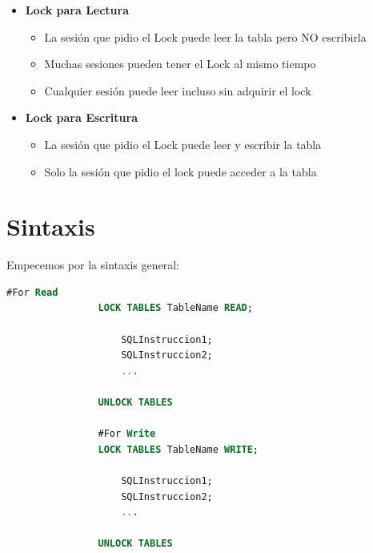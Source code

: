 \documentclass[12pt, fleqn]{report}                             %
\begin{document}
                \begin{itemize}
                    \item 
                        \textbf{Lock para Lectura}
                        \begin{itemize}
                            \item La sesión que pidio el Lock puede leer la tabla pero NO escribirla
                            \item Muchas sesiones pueden tener el Lock al mismo tiempo
                            \item Cualquier sesión puede leer incluso sin adquirir el lock
                        \end{itemize}

                    \item 
                        \textbf{Lock para Escritura}
                        \begin{itemize}
                            \item La sesión que pidio el Lock puede leer y escribir la tabla
                            \item Solo la sesión que pidio el lock puede acceder a la tabla
                        \end{itemize}
                \end{itemize}


        \clearpage
        \section{Sintaxis}

            Empecemos por la sintaxis general:

            \begin{lstlisting}[language=SQL, gobble=16]
                #For Read
                LOCK TABLES TableName READ;

                    SQLInstruccion1;
                    SQLInstruccion2;
                    ...

                UNLOCK TABLES

                #For Write
                LOCK TABLES TableName WRITE;

                    SQLInstruccion1;
                    SQLInstruccion2;
                    ...

                UNLOCK TABLES
            \end{lstlisting}
\end{document}
